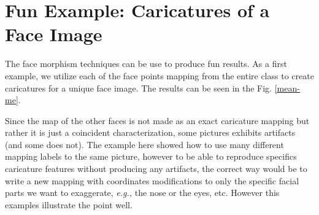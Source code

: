 \documentclass[11pt]{article}
\newcommand{\eg}{{\it e.g., }}
\begin{document}
\newpage



\section{Fun Example: Caricatures of a Face Image}

The face morphism techniques can be use to produce fun results. As a first example, we utilize each of the face points mapping from the entire class to create caricatures for a unique face image. The results can be seen in the Fig. \ref{mean-me}.

\quad


Since the map of the other faces is not made as an exact caricature mapping but rather it is just a coincident characterization, some pictures exhibits artifacts (and some does not). The example here showed how to use many different mapping labels to the same picture, however to be able to reproduce specifics caricature features without producing any artifacts, the correct way would be to write a new mapping with coordinates modifications to only  the specific facial parts we want to exaggerate, \eg the nose or the eyes, etc. However this examples illustrate the point well. 
\end{document}
